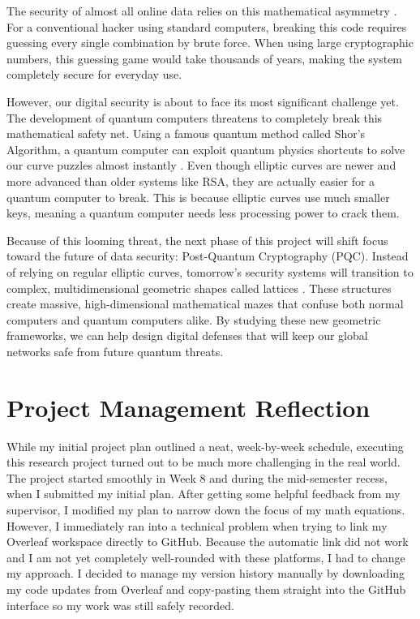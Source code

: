 \documentclass[11pt,a4paper]{article}
\begin{document}
The security of almost all online data relies on this mathematical asymmetry \cite{washington}. For a conventional hacker using standard computers, breaking this code requires guessing every single combination by brute force. When using large cryptographic numbers, this guessing game would take thousands of years, making the system completely secure for everyday use.

However, our digital security is about to face its most significant challenge yet. The development of quantum computers threatens to completely break this mathematical safety net. Using a famous quantum method called Shor's Algorithm, a quantum computer can exploit quantum physics shortcuts to solve our curve puzzles almost instantly \cite{shor1994}. Even though elliptic curves are newer and more advanced than older systems like RSA, they are actually easier for a quantum computer to break. This is because elliptic curves use much smaller keys, meaning a quantum computer needs less processing power to crack them.

Because of this looming threat, the next phase of this project will shift focus toward the future of data security: Post-Quantum Cryptography (PQC). Instead of relying on regular elliptic curves, tomorrow's security systems will transition to complex, multidimensional geometric shapes called lattices \cite{nist2024}. These structures create massive, high-dimensional mathematical mazes that confuse both normal computers and quantum computers alike. By studying these new geometric frameworks, we can help design digital defenses that will keep our global networks safe from future quantum threats.

\section{Project Management Reflection}
\label{sec:reflection}

While my initial project plan outlined a neat, week-by-week schedule, executing this research project turned out to be much more challenging in the real world. The project started smoothly in Week 8 and during the mid-semester recess, when I submitted my initial plan. After getting some helpful feedback from my supervisor, I modified my plan to narrow down the focus of my math equations. However, I immediately ran into a technical problem when trying to link my Overleaf workspace directly to GitHub. Because the automatic link did not work and I am not yet completely well-rounded with these platforms, I had to change my approach. I decided to manage my version history manually by downloading my code updates from Overleaf and copy-pasting them straight into the GitHub interface so my work was still safely recorded.
\end{document}
